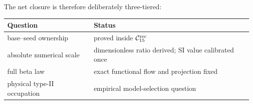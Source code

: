 The net closure is therefore deliberately three-tiered:
\begin{center}
\begin{tabular}{@{}ll@{}}
\toprule
Question & Status\\
\midrule
base--seed ownership & proved inside \(\mathcal C_{15}^{\rm rec}\)\\
absolute numerical scale & dimensionless ratio derived; SI value calibrated once\\
full beta law & exact functional flow and projection fixed\\
physical type-II occupation & empirical model-selection question\\
\bottomrule
\end{tabular}
\end{center}
